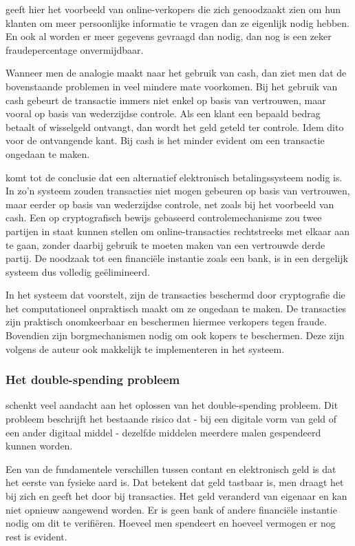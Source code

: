 			\textcite{Nakamoto2008} geeft hier het voorbeeld van online-verkopers die zich genoodzaakt zien om hun klanten om meer persoonlijke informatie te vragen dan ze eigenlijk nodig hebben. En ook al worden er meer gegevens gevraagd dan nodig, dan nog is een zeker fraudepercentage onvermijdbaar. 
		
			Wanneer men de analogie maakt naar het gebruik van cash, dan ziet men dat de bovenstaande problemen in veel mindere mate voorkomen. Bij het gebruik van cash gebeurt de transactie immers niet enkel op basis van vertrouwen, maar vooral op basis van wederzijdse controle. Als een klant een bepaald bedrag betaalt of wisselgeld ontvangt, dan wordt het geld geteld ter controle. Idem dito voor de ontvangende kant. Bij cash is het minder evident om een transactie ongedaan te maken. 
			
			\textcite{Nakamoto2008} komt tot de conclusie dat een alternatief elektronisch betalingssysteem nodig is. In zo’n systeem zouden transacties niet mogen gebeuren op basis van vertrouwen, maar eerder op basis van wederzijdse controle, net zoals bij het voorbeeld van cash. Een op cryptografisch bewijs gebaseerd controlemechanisme zou twee partijen in staat kunnen stellen om online-transacties rechtstreeks met elkaar aan te gaan, zonder daarbij gebruik te moeten maken van een vertrouwde derde partij. De noodzaak tot een financiële instantie zoals een bank, is in een dergelijk systeem dus volledig geëlimineerd.
		
			In het systeem dat \textcite{Nakamoto2008} voorstelt, zijn de transacties beschermd door cryptografie die het computationeel onpraktisch maakt om ze ongedaan te maken. De transacties zijn praktisch onomkeerbaar en beschermen hiermee verkopers tegen fraude. Bovendien zijn borgmechanismen nodig om ook kopers te beschermen. Deze zijn volgens de auteur ook makkelijk te implementeren in het systeem.
			
			\subsubsection{Het double-spending probleem}
			 \textcite{Nakamoto2008} schenkt veel aandacht aan het oplossen van het double-spending probleem. Dit probleem beschrijft het bestaande risico dat - bij een digitale vorm van geld of een ander digitaal middel - dezelfde middelen meerdere malen gespendeerd kunnen worden.
			
			Een van de fundamentele verschillen tussen contant en elektronisch geld is dat het eerste van fysieke aard is. Dat betekent dat geld tastbaar is, men draagt het bij zich en geeft het door bij transacties. Het geld veranderd van eigenaar en kan niet opnieuw aangewend worden. Er is geen bank of andere financiële instantie nodig om dit te verifiëren. Hoeveel men spendeert en hoeveel vermogen er nog rest is evident. 
			
